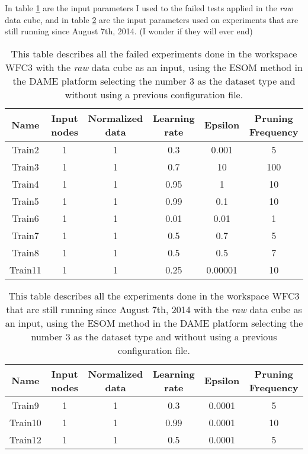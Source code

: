 \documentclass[11pt,fleqn]{book} %
\begin{document}
In table \ref{tab:ds9failed} are the input parameters I used to the failed tests applied in the \emph{raw} data cube, and in table \ref{tab:ds9running} are the input parameters used on experiments that are still running since August 7th, 2014. (I wonder if they will ever end)

\begin{table}[h!]
  \centering
    \begin{tabular}{ c c c c c c }
    \hline\hline
    
    Name & Input nodes & Normalized data & Learning rate & Epsilon & Pruning Frequency\\
    \hline
    
    Train2 & 1 & 1 & 0.3 & 0.001 & 5\\
    Train3 & 1 & 1 & 0.7 & 10 & 100\\
    Train4 & 1 & 1 & 0.95 & 1 & 10\\
    Train5 & 1 & 1 & 0.99 & 0.1 & 10\\
    Train6 & 1 & 1 & 0.01 & 0.01 & 1\\
    Train7 & 1 & 1 & 0.5 & 0.7 & 5\\
    Train8 & 1 & 1 & 0.5 & 0.5 & 7\\
    Train11 & 1 & 1 & 0.25 & 0.00001 & 10\\
    
    \hline
  \end{tabular}
  \caption{This table describes all the failed experiments done in the workspace WFC3 with the \emph{raw} data cube as an input, using the ESOM method in the DAME platform selecting the number 3 as the dataset type and without using a previous configuration file.}
  \label{tab:ds9failed}
\end{table}

\begin{table}[h!]
  \centering
    \begin{tabular}{ c c c c c c }
    \hline\hline
    
    Name & Input nodes & Normalized data & Learning rate & Epsilon & Pruning Frequency\\
    \hline
    
    Train9 & 1 & 1 & 0.3 & 0.0001 & 5\\
    Train10 & 1 & 1 & 0.99 & 0.0001 & 10\\
    Train12 & 1 & 1 & 0.5 & 0.0001 & 5\\
    
    \hline
  \end{tabular}
  \caption{This table describes all the experiments done in the workspace WFC3 that are still running since August 7th, 2014 with the \emph{raw} data cube as an input, using the ESOM method in the DAME platform selecting the number 3 as the dataset type and without using a previous configuration file.}
  \label{tab:ds9running}
\end{table}
\end{document}
